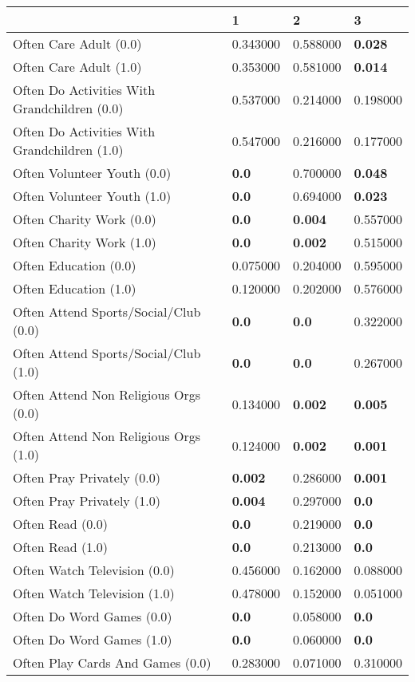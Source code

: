 \begin{tabular}{llll}
\toprule
 & 1 & 2 & 3 \\
\midrule
Often Care Adult (0.0) & 0.343000 & 0.588000 & \textbf{0.028} \\
Often Care Adult (1.0) & 0.353000 & 0.581000 & \textbf{0.014} \\
Often Do Activities With Grandchildren (0.0) & 0.537000 & 0.214000 & 0.198000 \\
Often Do Activities With Grandchildren (1.0) & 0.547000 & 0.216000 & 0.177000 \\
Often Volunteer Youth (0.0) & \textbf{0.0} & 0.700000 & \textbf{0.048} \\
Often Volunteer Youth (1.0) & \textbf{0.0} & 0.694000 & \textbf{0.023} \\
Often Charity Work (0.0) & \textbf{0.0} & \textbf{0.004} & 0.557000 \\
Often Charity Work (1.0) & \textbf{0.0} & \textbf{0.002} & 0.515000 \\
Often Education (0.0) & 0.075000 & 0.204000 & 0.595000 \\
Often Education (1.0) & 0.120000 & 0.202000 & 0.576000 \\
Often Attend Sports/Social/Club (0.0) & \textbf{0.0} & \textbf{0.0} & 0.322000 \\
Often Attend Sports/Social/Club (1.0) & \textbf{0.0} & \textbf{0.0} & 0.267000 \\
Often Attend Non Religious Orgs (0.0) & 0.134000 & \textbf{0.002} & \textbf{0.005} \\
Often Attend Non Religious Orgs (1.0) & 0.124000 & \textbf{0.002} & \textbf{0.001} \\
Often Pray Privately (0.0) & \textbf{0.002} & 0.286000 & \textbf{0.001} \\
Often Pray Privately (1.0) & \textbf{0.004} & 0.297000 & \textbf{0.0} \\
Often Read (0.0) & \textbf{0.0} & 0.219000 & \textbf{0.0} \\
Often Read (1.0) & \textbf{0.0} & 0.213000 & \textbf{0.0} \\
Often Watch Television (0.0) & 0.456000 & 0.162000 & 0.088000 \\
Often Watch Television (1.0) & 0.478000 & 0.152000 & 0.051000 \\
Often Do Word Games (0.0) & \textbf{0.0} & 0.058000 & \textbf{0.0} \\
Often Do Word Games (1.0) & \textbf{0.0} & 0.060000 & \textbf{0.0} \\
Often Play Cards And Games (0.0) & 0.283000 & 0.071000 & 0.310000 \\

\end{tabular}
